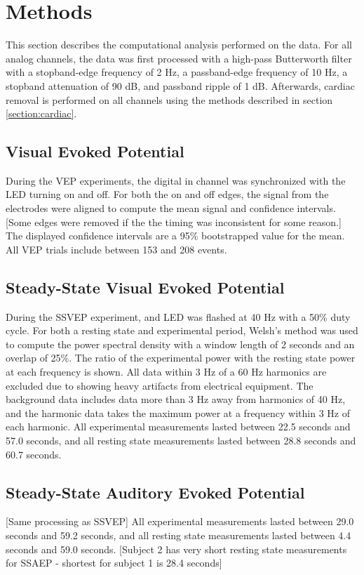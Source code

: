 \documentclass[]{article}
\begin{document}

\section{Methods}
This section describes the computational analysis performed on the data.
For all analog channels, the data was first processed with a high-pass Butterworth filter with a stopband-edge frequency of 2 Hz, a passband-edge frequency of 10 Hz, a stopband attenuation of 90 dB, and passband ripple of 1 dB.
Afterwards, cardiac removal is performed on all channels using the methods described in section \ref{section:cardiac}.

\subsection{Visual Evoked Potential}
During the VEP experiments, the digital in channel was synchronized with the LED turning on and off.
For both the on and off edges, the signal from the electrodes were aligned to compute the mean signal and confidence intervals.
[Some edges were removed if the the timing was inconsistent for some reason.]
The displayed confidence intervals are a 95\% bootstrapped value for the mean.
All VEP trials include between 153 and 208 events.

\subsection{Steady-State Visual Evoked Potential}
During the SSVEP experiment, and LED was flashed at 40 Hz with a 50\% duty cycle.
For both a resting state and experimental period, Welsh's method was used to compute the power spectral density with a window length of 2 seconds and an overlap of 25\%.
The ratio of the experimental power with the resting state power at each frequency is shown.
All data within 3 Hz of a 60 Hz harmonics are excluded due to showing heavy artifacts from electrical equipment.
The background data includes data more than 3 Hz away from harmonics of 40 Hz, and the harmonic data takes the maximum power at a frequency within 3 Hz of each harmonic.
All experimental measurements lasted between 22.5 seconds and 57.0 seconds, and all resting state measurements lasted between 28.8 seconds and 60.7 seconds.
\subsection{Steady-State Auditory Evoked Potential}
[Same processing as SSVEP]
All experimental measurements lasted between 29.0 seconds and 59.2 seconds, and all resting state measurements lasted between 4.4 seconds and 59.0 seconds.
[Subject 2 has very short resting state measurements for SSAEP - shortest for subject 1 is 28.4 seconds]
\end{document}
